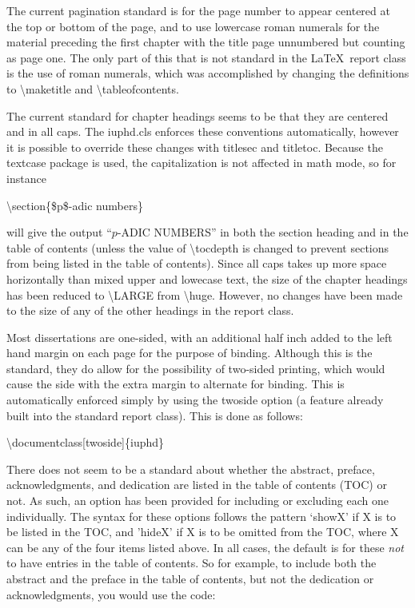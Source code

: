 \documentclass{iuphd}
\begin{document}
The current pagination standard is for the page number to appear centered at the top or bottom of the
page, and to use lowercase roman numerals for the material preceding the first chapter with the title page unnumbered but counting as
page one. The only part of this that is not standard in the \LaTeX \ report class is the use of roman numerals, which was accomplished
by changing the definitions to \textbackslash maketitle and \textbackslash tableofcontents.

The current standard for chapter headings seems to be that they are centered and in all caps.  The iuphd.cls enforces these
conventions automatically, however it is possible to override these changes with titlesec and titletoc. Because the textcase package is used,
the capitalization is not affected in math mode, so for instance
\medskip

\textbackslash section\{\$p\$-adic numbers\}
\medskip

\noindent will give the output ``$p$-ADIC NUMBERS'' in both the section heading and in the table of contents
(unless the value of \textbackslash tocdepth is changed to prevent sections from being listed in the table of contents).
Since all caps takes up more space horizontally than mixed upper and lowecase text, the size of the chapter headings
has been reduced to \textbackslash LARGE from \textbackslash huge.  However, no changes have been made to the size of any of the
other headings in the report class.

Most dissertations are one-sided, with an additional half inch added to the left hand margin on each page for the purpose of binding.
Although this is the standard, they do allow for the possibility of two-sided printing, which would cause the side with the extra margin
to alternate for binding.  This is automatically enforced simply by using the twoside option (a feature already built into the
standard report class). This is done as follows:
\medskip

\textbackslash documentclass[twoside]\{iuphd\}
\medskip

There does not seem to be a standard about whether the abstract, preface, acknowledgments, and dedication are listed in the table of
contents (TOC) or not.  As such, an option has been provided for including or excluding each one individually.  The syntax for these options
follows the pattern `showX' if X is to be listed in the TOC, and 'hideX' if X is to be omitted from the TOC, where X can be any of the four
items listed above.  In all cases, the default is for these \emph{not} to have entries in the table of contents.  So for example, to include
both the abstract and the preface in the table of contents, but not the dedication or acknowledgments, you would use the code:
\medskip
\end{document}
